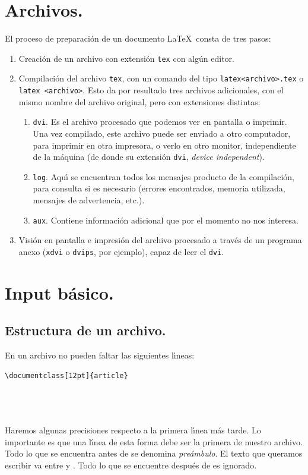 \section{Archivos.}

El proceso de preparaci{\'o}n de un documento \LaTeX\ consta de tres
pasos: 

\begin{enumerate}
\item Creaci{\'o}n de un archivo con extensi{\'o}n \verb+tex+ con
alg{\'u}n editor.
\item Compilaci{\'o}n del archivo \verb+tex+, con un comando del tipo
\verb+latex+\linebreak \verb+<archivo>.tex+ o \verb+latex <archivo>+.
Esto da por 
resultado tres archivos adicionales, con el mismo nombre del archivo
original, pero con extensiones distintas:

\begin{enumerate}
\item \verb+dvi+. Es el archivo procesado que podemos ver en pantalla
o imprimir. Una vez compilado, este archivo puede ser enviado a otro
computador, para imprimir en otra impresora, o verlo en otro monitor,
independiente de la m{\'a}quina (de donde su extensi{\'o}n \verb+dvi+,
{\em device independent\/}). 
\item \verb+log+. Aqu{\'\i} se encuentran todos los mensajes producto
de la compilaci{\'o}n, para consulta si es necesario (errores
encontrados, memoria utilizada, mensajes de advertencia, etc.).
\item \verb+aux+. Contiene informaci{\'o}n adicional que por el momento
no nos interesa.
\end{enumerate}

\item Visi{\'o}n en pantalla e impresi{\'o}n del archivo procesado a
trav{\'e}s de un programa anexo (\verb+xdvi+ o \verb+dvips+, por ejemplo), capaz de leer
el \verb+dvi+.
\end{enumerate}


\section{Input b{\'a}sico.}

\subsection{Estructura de un archivo.}

En un archivo no pueden faltar las siguientes l{\'\i}neas:
\begin{verbatim}
\documentclass[12pt]{article}




\end{verbatim}
Haremos algunas precisiones respecto a la primera l{\'\i}nea m{\'a}s
tarde. Lo importante es que una l{\'\i}nea de esta forma debe ser la
primera de nuestro archivo. Todo lo que se encuentra antes de
\verb++ se denomina {\em pre{\'a}mbulo}. El texto que
queramos escribir va entre \verb++ y
\verb++. Todo lo que se encuentre despu{\'e}s de
\verb++ es ignorado.

